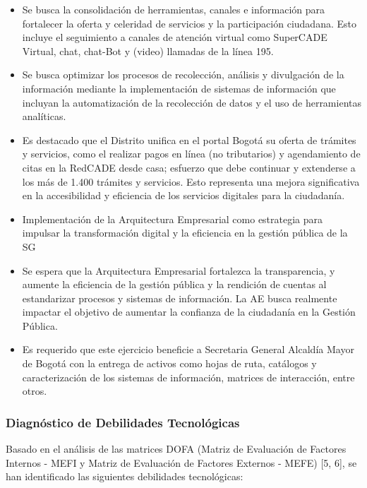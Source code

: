 \documentclass[
	a4paper, %
	12pt, %
]{include/CSSullivanBusinessReport}
\def\tightlist{}
\begin{document}
\begin{itemize}
  \begin{itemize}
  \tightlist
  \item
    Se busca la consolidación de herramientas, canales e información
    para fortalecer la oferta y celeridad de servicios y la
    participación ciudadana. Esto incluye el seguimiento a canales de
    atención virtual como SuperCADE Virtual, chat, chat-Bot y (video)
    llamadas de la línea 195.
  \item
    Se busca optimizar los procesos de recolección, análisis y
    divulgación de la información mediante la implementación de sistemas
    de información que incluyan la automatización de la recolección de
    datos y el uso de herramientas analíticas.
  \item
    Es destacado que el Distrito unifica en el portal Bogotá su oferta
    de trámites y servicios, como el realizar pagos en línea (no
    tributarios) y agendamiento de citas en la RedCADE desde casa;
    esfuerzo que debe continuar y extenderse a los más de 1.400 trámites
    y servicios. Esto representa una mejora significativa en la
    accesibilidad y eficiencia de los servicios digitales para la
    ciudadanía.
  \item
    Implementación de la Arquitectura Empresarial como estrategia para
    impulsar la transformación digital y la eficiencia en la gestión
    pública de la SG
  \item
    Se espera que la Arquitectura Empresarial fortalezca la
    transparencia, y aumente la eficiencia de la gestión pública y la
    rendición de cuentas al estandarizar procesos y sistemas de
    información. La AE busca realmente impactar el objetivo de aumentar
    la confianza de la ciudadanía en la Gestión Pública.
  \item
    Es requerido que este ejercicio beneficie a Secretaria General
    Alcaldía Mayor de Bogotá con la entrega de activos como hojas de
    ruta, catálogos y caracterización de los sistemas de información,
    matrices de interacción, entre otros.
  \end{itemize}
\end{itemize}

\subsubsection{Diagnóstico de Debilidades
Tecnológicas}\label{sec:diagnuxf3stico-de-debilidades-tecnoluxf3gicas}

Basado en el análisis de las matrices DOFA (Matriz de Evaluación de
Factores Internos - MEFI y Matriz de Evaluación de Factores Externos -
MEFE) {[}5, 6{]}, se han identificado las siguientes debilidades
tecnológicas:
\end{document}
